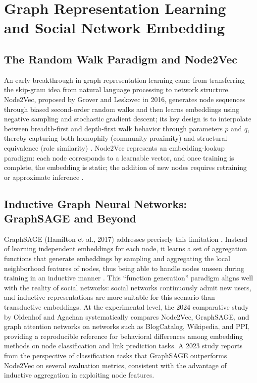 \documentclass[12pt,a4paper]{article}
\begin{document}
\section{Graph Representation Learning and Social Network Embedding}

\subsection{The Random Walk Paradigm and Node2Vec}

An early breakthrough in graph representation learning came from transferring the skip-gram idea from natural language processing to network structure. Node2Vec, proposed by Grover and Leskovec in 2016, generates node sequences through biased second-order random walks and then learns embeddings using negative sampling and stochastic gradient descent; its key design is to interpolate between breadth-first and depth-first walk behavior through parameters $p$ and $q$, thereby capturing both homophily (community proximity) and structural equivalence (role similarity) \cite{ref10}. Node2Vec represents an embedding-lookup paradigm: each node corresponds to a learnable vector, and once training is complete, the embedding is static; the addition of new nodes requires retraining or approximate inference \cite{ref10}.

\subsection{Inductive Graph Neural Networks: GraphSAGE and Beyond}

GraphSAGE (Hamilton et al., 2017) addresses precisely this limitation \cite{ref11}. Instead of learning independent embeddings for each node, it learns a set of aggregation functions that generate embeddings by sampling and aggregating the local neighborhood features of nodes, thus being able to handle nodes unseen during training in an inductive manner \cite{ref11}. This ``function generation'' paradigm aligns well with the reality of social networks: social networks continuously admit new users, and inductive representations are more suitable for this scenario than transductive embeddings. At the experimental level, the 2024 comparative study by Oldenhof and Agachan systematically compares Node2Vec, GraphSAGE, and graph attention networks on networks such as BlogCatalog, Wikipedia, and PPI, providing a reproducible reference for behavioral differences among embedding methods on node classification and link prediction tasks. A 2023 study reports from the perspective of classification tasks that GraphSAGE outperforms Node2Vec on several evaluation metrics, consistent with the advantage of inductive aggregation in exploiting node features.
\end{document}
